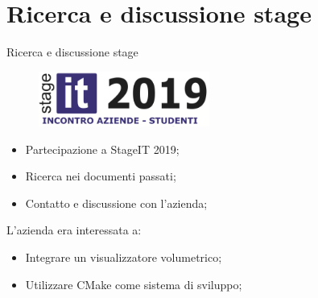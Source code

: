 \documentclass{beamer}
\begin{document}
	\section{Ricerca e discussione stage}
	\begin{frame}{Ricerca e discussione stage}
	
	\begin{figure}[ht]
    	\centering
    	\includegraphics[width=0.5\textwidth]{Images/stageit2019.png}
	\end{figure}
	
	\begin{itemize}
		\item Partecipazione a StageIT 2019;
		\item Ricerca nei documenti passati;
		\item Contatto e discussione con l'azienda;
	\end{itemize}
	
	L'azienda era interessata a:
	\begin{itemize}
		\item Integrare un visualizzatore volumetrico;
		\item Utilizzare CMake come sistema di sviluppo;
	\end{itemize}
	
	\end{frame}
	
	
\end{document}
